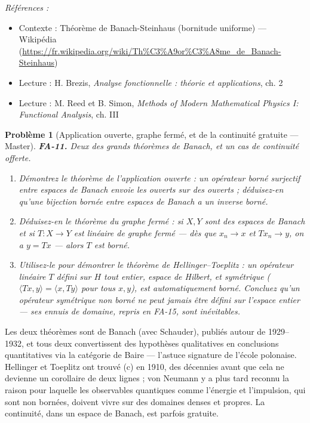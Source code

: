 \documentclass[11pt]{article}
\newtheorem{problem}{Problème}
\newenvironment{refs}{\par\small\noindent\emph{Références :}\begin{itemize}\setlength\itemsep{0pt}}{\end{itemize}\normalsize}
\begin{document}
\begin{refs}
\item Contexte : Théorème de Banach-Steinhaus (bornitude uniforme) --- Wikipédia (\url{https://fr.wikipedia.org/wiki/Th%C3%A9or%C3%A8me_de_Banach-Steinhaus})
\item Lecture : H. Brezis, \textit{Analyse fonctionnelle : théorie et applications}, ch. 2
\item Lecture : M. Reed et B. Simon, \textit{Methods of Modern Mathematical Physics I: Functional Analysis}, ch. III
\end{refs}

\bigskip

\begin{problem}[{Application ouverte, graphe fermé, et de la continuité gratuite --- Master}]
\textbf{FA-11.} Deux des grands théorèmes de Banach, et un cas de continuité offerte.
\begin{enumerate}
\item[(a)] Démontrez le théorème de l'application ouverte : un opérateur borné surjectif entre espaces de
Banach envoie les ouverts sur des ouverts ; déduisez-en qu'une bijection bornée entre espaces de
Banach a un inverse borné.
\item[(b)] Déduisez-en le théorème du graphe fermé : si $ X, Y $ sont des espaces de Banach et si
$ T : X \to Y $ est linéaire de graphe fermé --- dès que $ x_n \to x $ et $ Tx_n \to y $, on a
$ y = Tx $ --- alors $ T $ est borné.
\item[(c)] Utilisez-le pour démontrer le théorème de Hellinger--Toeplitz : un opérateur linéaire $ T $
défini sur $ H $ \textit{tout entier}, espace de Hilbert, et symétrique
($ \langle Tx, y\rangle = \langle x, Ty\rangle $ pour tous $ x, y $), est automatiquement borné.
Concluez qu'un opérateur symétrique non borné ne peut jamais être défini sur l'espace entier --- ses
ennuis de domaine, repris en FA-15, sont inévitables.
\end{enumerate}

\end{problem}

\noindent Les deux théorèmes sont de Banach (avec Schauder), publiés autour de 1929--1932, et
tous deux convertissent des hypothèses qualitatives en conclusions quantitatives via la catégorie de
Baire --- l'astuce signature de l'école polonaise. Hellinger et Toeplitz ont trouvé (c) en 1910, des
décennies avant que cela ne devienne un corollaire de deux lignes ; von Neumann y a plus tard reconnu la
raison pour laquelle les observables quantiques comme l'énergie et l'impulsion, qui sont non bornées,
doivent vivre sur des domaines denses et propres. La continuité, dans un espace de Banach, est parfois
gratuite.
\end{document}
